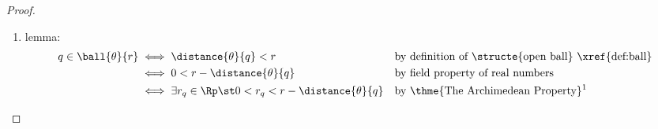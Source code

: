 \begin{proof}
\begin{enumerate}
  \item lemma: \label{ilem:openball_openset_lem}
    \begin{align*}
      q\in\ball{\theta}{r}
        &\iff \distance{\theta}{q} < r
       && \text{by definition of \structe{open ball} \xref{def:ball}}
      \\&\iff 0< r-\distance{\theta}{q} 
        && \text{by field property of real numbers}
      \\&\iff \exists r_q\in\Rp \st 0< r_q< r-\distance{\theta}{q}
        &&\text{by \thme{The Archimedean Property}\footnotemark}
    \end{align*}


\end{enumerate}
\end{proof}
